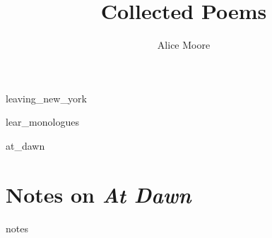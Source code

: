 \documentclass[ebook, twoside,openright, final]{memoir}
\title{Collected Poems}
\author{Alice Moore}
\date{}
\begin{document}
\setlength\epigraphwidth{5cm}
\setlength\epigraphrule{0pt}
\epigraphfontsize{\footnotesize}

\setlength\vgap{2.5em}

\PlainPoemTitle

\pagestyle{simple}

\frontmatter

\begin{titlingpage}
\maketitle
\end{titlingpage}

\let\tocheadstart\relax
\tableofcontents*

\renewcommand{\printpartnum}{}
\renewcommand{\printpartname}{}
\renewcommand{\printchaptername}{}
\renewcommand{\printchapternum}{}

\mainmatter

{leaving_new_york}

{lear_monologues}


{at_dawn}

\renewcommand\appendixname{Notes}

\appendix

\chapter{Notes on \textit{At Dawn}}
{notes}
\end{document}
